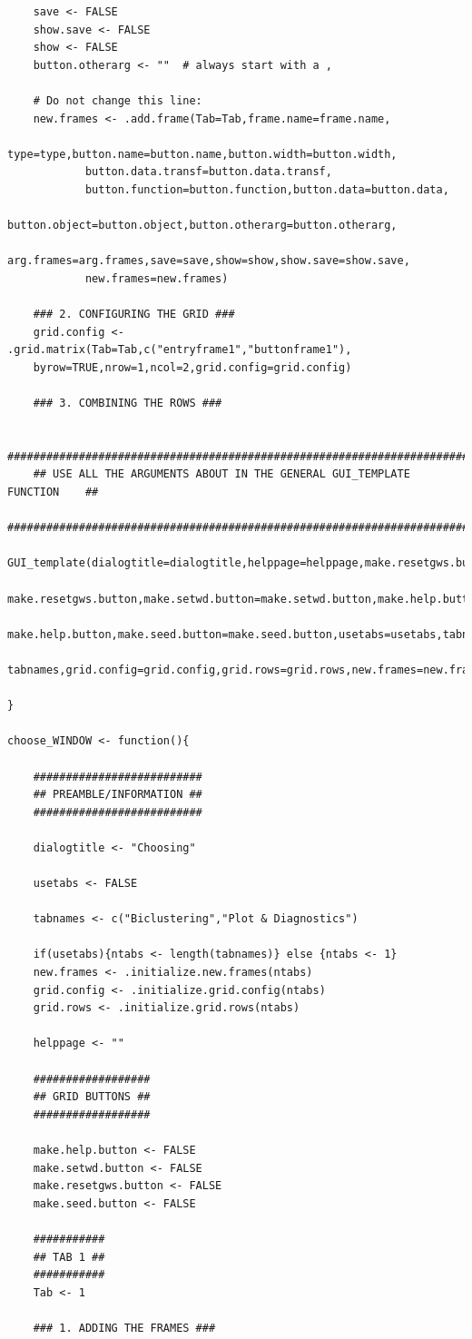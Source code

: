 \documentclass[a4paper]{article}\usepackage[]{graphicx}\usepackage[]{color}
\begin{document}
\begin{verbatim}
	save <- FALSE
	show.save <- FALSE
	show <- FALSE
	button.otherarg <- ""  # always start with a ,
	
	# Do not change this line: 
	new.frames <- .add.frame(Tab=Tab,frame.name=frame.name,
			type=type,button.name=button.name,button.width=button.width,
			button.data.transf=button.data.transf,
			button.function=button.function,button.data=button.data,
			button.object=button.object,button.otherarg=button.otherarg,
			arg.frames=arg.frames,save=save,show=show,show.save=show.save,
			new.frames=new.frames)
	
	### 2. CONFIGURING THE GRID ###
	grid.config <- .grid.matrix(Tab=Tab,c("entryframe1","buttonframe1"),
    byrow=TRUE,nrow=1,ncol=2,grid.config=grid.config)
		
	### 3. COMBINING THE ROWS ###
	
	#########################################################################
	## USE ALL THE ARGUMENTS ABOUT IN THE GENERAL GUI_TEMPLATE FUNCTION    ##
	#########################################################################
	GUI_template(dialogtitle=dialogtitle,helppage=helppage,make.resetgws.button=
    make.resetgws.button,make.setwd.button=make.setwd.button,make.help.button=
    make.help.button,make.seed.button=make.seed.button,usetabs=usetabs,tabnames=
    tabnames,grid.config=grid.config,grid.rows=grid.rows,new.frames=new.frames)
	
}

choose_WINDOW <- function(){
	
	##########################
	## PREAMBLE/INFORMATION ##
	##########################
	
	dialogtitle <- "Choosing"
		
	usetabs <- FALSE
	
	tabnames <- c("Biclustering","Plot & Diagnostics")
	
	if(usetabs){ntabs <- length(tabnames)} else {ntabs <- 1}
	new.frames <- .initialize.new.frames(ntabs)
	grid.config <- .initialize.grid.config(ntabs)
	grid.rows <- .initialize.grid.rows(ntabs)
		
	helppage <- ""
	
	##################
	## GRID BUTTONS ##
	##################
	
	make.help.button <- FALSE
	make.setwd.button <- FALSE
	make.resetgws.button <- FALSE
	make.seed.button <- FALSE
	
	###########
	## TAB 1 ##
	###########
	Tab <- 1
	
	### 1. ADDING THE FRAMES ###
		

\end{verbatim}
\end{document}

